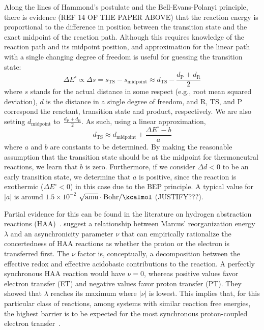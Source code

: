 Along the lines of Hammond's postulate and the Bell-Evans-Polanyi principle,
there is evidence (REF 14 OF THE PAPER ABOVE) that the reaction energy is
proportional to the difference in position between the transition state and the
exact midpoint of the reaction path.
Although this requires knowledge of the reaction path and its midpoint
position, and approximation for the linear path with a single changing degree
of freedom is useful for guessing the transition state:
%
\begin{equation}
	\Delta E^\circ \propto \Delta s
	= s_\text{TS} - s_\text{midpoint}
	\approx d_\text{TS} - \frac{d_\text{P} + d_\text{R}}{2}
\end{equation}
%
where $s$ stands for the actual distance in some respect (e.g., root mean
squared deviation), $d$ is the distance in a single degree of freedom, and R,
TS, and P correspond the reactant, transition state and product, respectively.
We are also setting $d_\text{midpoint}$
to~$\frac{d_\text{P} + d_\text{R}}{2}$.
As such, using a linear approximation,
%
\begin{equation}
	d_\text{TS}
	\approx d_\text{midpoint} + \frac{\Delta E^\circ - b}{a}
\end{equation}
%
where $a$ and $b$ are constants to be determined.
By making the reasonable assumption that the transition state should be at the
midpoint for thermoneutral reactions, we learn that $b$ is zero.
Furthermore, if we consider $\Delta d < 0$ to be an early transition state, we
determine that $a$ is positive, since the reaction is exothermic
($\Delta E^\circ < 0$) in this case due to the BEP principle.
A typical value for $|a|$ is around
$1.5 \times 10^{-2}$
$\sqrt{\text{amu}}\cdot\text{Bohr} / \text{\kcalmol}$
(JUSTIFY???).

Partial evidence for this can be found in the literature on hydrogen
abstraction reactions (HAA)~\cite{Bim2018}.
\citeauthor{Bim2018} suggest a relationship between Marcus' reorganization
energy $\lambda$ and an asynchronicity parameter $\nu$ that can empirically
rationalize the concertedness of HAA reactions as whether the proton or the
electron is transferred first.
The $\nu$ factor is, conceptually, a decomposition between the effective redox
and effective acidobasic contributions to the reaction.
A perfectly synchronous HAA reaction would have $\nu = 0$, whereas positive
values favor electron transfer (ET) and negative values favor proton transfer
(PT).
They showed that $\lambda$ reaches its maximum where $|\nu|$ is lowest.
This implies that, for this particular class of reactions, among systems with
similar reaction free energies, the highest barrier is to be expected for the
most synchronous proton-coupled electron transfer~\cite{Bim2018}.

